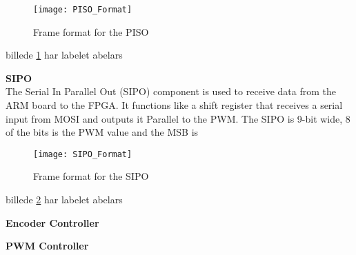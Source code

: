 \documentclass[rapport.tex]{subfiles}
\begin{document}
\begin{figure}[h]
	\centering
	\texttt{[image: PISO\_Format]}
	\caption{Frame format for the PISO}
	\label{PISO_Format}
\end{figure}

billede \ref{PISO_Format} har labelet abelars

\textbf{SIPO}\\
The Serial In Parallel Out (SIPO) component is used to receive data from the ARM board to the FPGA. It functions like a shift register that receives a serial input from MOSI and outputs it Parallel to the PWM. The SIPO is 9-bit wide, 8 of the bits is the PWM value and the MSB is 

\begin{figure}[h]
	\centering
	\texttt{[image: SIPO\_Format]}
	\caption{Frame format for the SIPO}
	\label{SIPO_Format}
\end{figure}

billede \ref{SIPO_Format} har labelet abelars


\textbf{Encoder Controller}

\textbf{PWM Controller}
\end{document}
